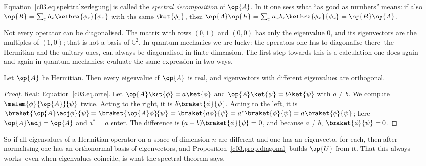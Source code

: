 Equation~\eqref{c03.eq.spektralzerlegung} is called the \emph{spectral decomposition} of $\op{A}$.
In it one sees what ``as good as numbers'' means: if also
$\op{B} = \sum_x b_x \ketbra{\phi_x}{\phi_x}$ with the same $\ket{\phi_x}$, then
$\op{A}\op{B} = \sum_x a_x b_x \ketbra{\phi_x}{\phi_x} = \op{B}\op{A}$.

Not every operator can be diagonalised. The matrix with rows $(0, 1)$ and $(0, 0)$ has only the
eigenvalue $0$, and its eigenvectors are the multiples of $(1, 0)$; that is not a basis of
$\mathbb{C}^2$. In quantum mechanics we are lucky: the operators one has to diagonalise there, the
Hermitian and the unitary ones, can always be diagonalised in finite dimension. The first step
towards this is a calculation one does again and again in quantum mechanics: evaluate the same
expression in two ways.

\begin{proposition}\label{c03.prop.eigen-hermitesch}
  Let $\op{A}$ be Hermitian. Then every eigenvalue of $\op{A}$ is real, and eigenvectors with
  different eigenvalues are orthogonal.
\end{proposition}
\begin{proof}
  Real: Equation~\eqref{c03.eq.orte}. Let $\op{A}\ket{\phi} = a\ket{\phi}$ and
  $\op{A}\ket{\psi} = b\ket{\psi}$ with $a \neq b$. We compute $\melem{\phi}{\op{A}}{\psi}$
  twice. Acting to the right, it is $b\braket{\phi}{\psi}$. Acting to the left, it is
  $\braket{\op{A}\adj\phi}{\psi} = \braket{\op{A}\phi}{\psi} = \braket{a\phi}{\psi} = a^*\braket{\phi}{\psi} = a\braket{\phi}{\psi}$;
  here $\op{A}\adj = \op{A}$ and $a^* = a$ enter. The difference is
  $(a - b)\braket{\phi}{\psi} = 0$, and because $a \neq b$, $\braket{\phi}{\psi} = 0$.
\end{proof}

So if all eigenvalues of a Hermitian operator on a space of dimension $n$ are different and one has
an eigenvector for each, then after normalising one has an orthonormal basis of eigenvectors, and
Proposition~\ref{c03.prop.diagonal} builds $\op{U}$ from it. That this always works, even when
eigenvalues coincide, is what the spectral theorem says.

